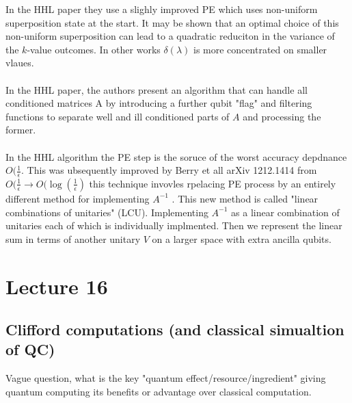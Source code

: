 \documentclass{article}
\begin{document}
                        In the HHL paper they use a slighly improved PE which uses non-uniform superposition state at the start. It may be shown that an optimal choice of this non-uniform superposition can lead to a quadratic reduciton in the variance of the $k$-value outcomes. In other works $\delta(\lambda)$ is more concentrated on smaller vlaues.\\\\
                        In the HHL paper, the authors present an algorithm that can handle all conditioned matrices A by introducing a further qubit "flag" and filtering functions to separate well and ill conditioned parts of $A$ and processing the former. \\\\
                        In the HHL algorithm the PE step is the soruce of the worst accuracy depdnance $O(\frac{1}{\epsilon}$. This was ubsequently improved  by Berry et all arXiv 1212.1414 from $O(\frac{1}{\epsilon} \rightarrow O(\log( \frac{1}{\epsilon})$ this technique invovles rpelacing PE process by an entirely different method for implementing $A^{-1}$ . This new method is called "linear combinations of unitaries" (LCU). Implementing $A^{-1}$ as a linear combination of unitaries each of which is individually implmented. Then we represent the linear sum in terms of another unitary $V$ on a larger space with extra ancilla qubits.
                        \section{Lecture 16}
                        \subsection{Clifford computations (and classical simualtion of QC)}
                        Vague question, what is the key "quantum effect/resource/ingredient" giving quantum computing its benefits or advantage over classical computation.
\end{document}
